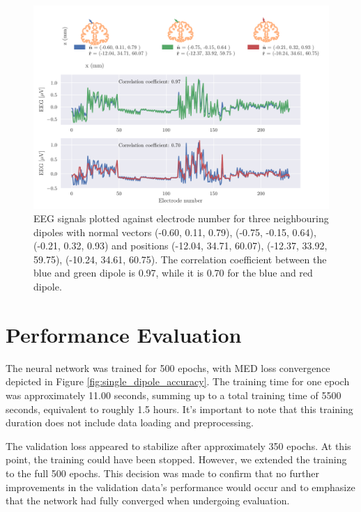 \documentclass[a4paper, UKenglish, 11pt]{uiomaster}
\begin{document}
\begin{figure}[!htb]
    \centering
    \includegraphics[width=\linewidth]{figures/compare_dipoles.pdf}
    \caption{EEG signals plotted against electrode number for three neighbouring dipoles with normal vectors (-0.60, 0.11, 0.79), (-0.75, -0.15, 0.64), (-0.21, 0.32, 0.93) and positions (-12.04, 34.71, 60.07), (-12.37, 33.92, 59.75), (-10.24, 34.61, 60.75). The correlation coefficient between the blue and green dipole is 0.97, while it is 0.70 for the blue and red dipole. }
    \label{fig:neighbour_dipoles}
\end{figure}


\section{Performance Evaluation}
The neural network was trained for 500 epochs, with MED loss convergence depicted in Figure \ref{fig:single_dipole_accuracy}. The training time for one epoch was approximately 11.00 seconds, summing up to a total training time of 5500 seconds, equivalent to roughly 1.5 hours. It's important to note that this training duration does not include data loading and preprocessing.

The validation loss appeared to stabilize after approximately 350 epochs. At this point, the training could have been stopped. However, we extended the training to the full 500 epochs. This decision was made to confirm that no further improvements in the validation data's performance would occur and to emphasize that the network had fully converged when undergoing evaluation.
\end{document}
